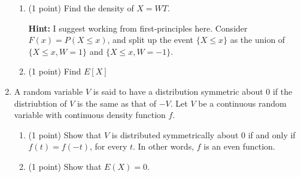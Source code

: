 \documentclass[10pt,twoside]{article}\usepackage[]{graphicx}\usepackage[dvipsnames,svgnames,table]{xcolor}
\begin{document}
\begin{enumerate}
    \begin{enumerate}
      \item (1 point) Find the density of $X = WT$.
      
    \textbf{Hint:} I suggest working from first-principles here. Consider $F(x) = P(X \leq x)$, and split up the event $\{X \leq x\}$ as the union of $\{X \leq x, W = 1\}$ and $\{X \leq x, W = -1\}$.
    
    \item (1 point) Find $E[X]$
    \end{enumerate}
    
    


    \item A random variable $V$ is said to have a distribution symmetric about $0$ if the distriubtion of $V$ is the same as that of $-V$. Let $V$ be a continuous random variable with continuous density function $f$.
    
    \begin{enumerate}
        \item (1 point) Show that $V$ is distributed symmetrically about $0$ if and only if $f(t) = f(-t)$, for every $t$. In other words, $f$ is an even function.
        
        \item (1 point) Show that $E(X) = 0$.
    \end{enumerate}
    
\end{enumerate}
\end{document}
